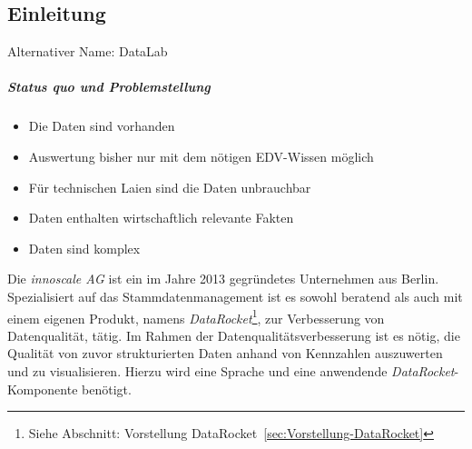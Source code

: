 \documentclass[
  language=german, %
  type=bachelor%
]{isthesis}
\begin{document}
\begin{content}



  \chapter{Einleitung}

  Alternativer Name: DataLab


  \paragraph{Status quo und Problemstellung}
  \begin{itemize}
    \item Die Daten sind vorhanden
    \item Auswertung bisher nur mit dem nötigen EDV-Wissen möglich
    \item Für technischen Laien sind die Daten unbrauchbar
    \item Daten enthalten wirtschaftlich relevante Fakten
    \item Daten sind komplex
  \end{itemize}

  Die \textit{innoscale AG} ist ein im Jahre 2013 gegründetes Unternehmen aus
  Berlin.  Spezialisiert auf das Stammdatenmanagement ist es sowohl beratend
  als auch mit einem eigenen Produkt, namens \textit{DataRocket}\footnote{Siehe
  Abschnitt: Vorstellung DataRocket~\ref{sec:Vorstellung-DataRocket}}, zur
  Verbesserung von Datenqualität, tätig. Im Rahmen der
  Datenqualitätsverbesserung ist es nötig, die Qualität von zuvor strukturierten
  Daten anhand von Kennzahlen auszuwerten und zu visualisieren. Hierzu wird eine
  Sprache und eine anwendende \textit{DataRocket}-Komponente benötigt.

  \begin{figure}[caption={DataRockets Datapipeline-Bausteine}, label={}]
  \end{figure}


\end{content}
\end{document}
